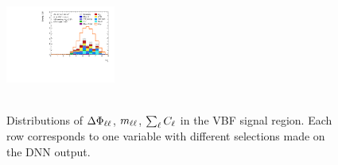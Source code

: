 \begin{figure}[ht]
{        \includegraphics[width=0.32\textwidth]{figures/hww/dnn/blinded/run2-emme-CutVBFSR_DNN87-DYjj-lin.pdf}
    } \\
     \\
    {\caption{Distributions of $\Delta\Phi_{\ell\ell}$, $m_{\ell\ell}$, $\sum_\ell C_\ell$ in the VBF signal region.
        Each row corresponds to one variable with different selections made on the DNN output.
        \label{fig:dnn-inputs-vbf-top1} }}
\end{figure}


